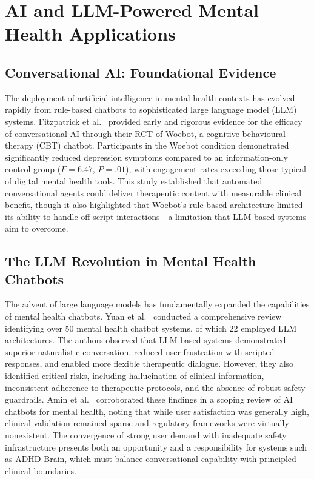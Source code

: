 \section{AI and LLM-Powered Mental Health Applications}
\label{sec:litrev_ai_mental_health}

\subsection{Conversational AI: Foundational Evidence}
\label{sec:litrev_conversational_ai}

The deployment of artificial intelligence in mental health contexts has evolved rapidly from rule-based chatbots to sophisticated large language model (LLM) systems. Fitzpatrick et al.~\cite{fitzpatrick2017} provided early and rigorous evidence for the efficacy of conversational AI through their RCT of Woebot, a cognitive-behavioural therapy (CBT) chatbot. Participants in the Woebot condition demonstrated significantly reduced depression symptoms compared to an information-only control group ($F = 6.47$, $P = .01$), with engagement rates exceeding those typical of digital mental health tools. This study established that automated conversational agents could deliver therapeutic content with measurable clinical benefit, though it also highlighted that Woebot's rule-based architecture limited its ability to handle off-script interactions---a limitation that LLM-based systems aim to overcome.

\subsection{The LLM Revolution in Mental Health Chatbots}
\label{sec:litrev_llm_revolution}

The advent of large language models has fundamentally expanded the capabilities of mental health chatbots. Yuan et al.~\cite{yuan2025} conducted a comprehensive review identifying over 50 mental health chatbot systems, of which 22 employed LLM architectures. The authors observed that LLM-based systems demonstrated superior naturalistic conversation, reduced user frustration with scripted responses, and enabled more flexible therapeutic dialogue. However, they also identified critical risks, including hallucination of clinical information, inconsistent adherence to therapeutic protocols, and the absence of robust safety guardrails. Amin et al.~\cite{amin2024} corroborated these findings in a scoping review of AI chatbots for mental health, noting that while user satisfaction was generally high, clinical validation remained sparse and regulatory frameworks were virtually nonexistent. The convergence of strong user demand with inadequate safety infrastructure presents both an opportunity and a responsibility for systems such as ADHD Brain, which must balance conversational capability with principled clinical boundaries.

